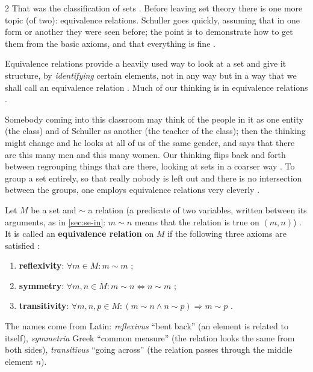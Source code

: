 \begin{paracol}{2}
That was the classification of sets . Before leaving set theory there is one more topic (of two):
equivalence relations. Schuller goes quickly, assuming that in one form or another they were seen before; the point is to
demonstrate how to get them from the basic axioms, and that everything is fine .

Equivalence relations provide a heavily used way to look at a set and give it structure, by \emph{identifying} certain
elements, not in any way but in a way that we shall call an equivalence relation . Much of our
thinking is in equivalence relations .

\begin{intuition}[Regrouping]\label{int:cl-regroup}
Somebody coming into this classroom may think of the people in it as one entity (the class) and of Schuller as
another (the teacher of the class); then the thinking might change and he looks at all of us of the same gender, and says
that there are this many men and this many women. Our thinking flips back and forth between regrouping things that are
there, looking at sets in a coarser way . To group a set entirely, so that really nobody is
left out and there is no intersection between the groups, one employs equivalence relations very cleverly
.
\end{intuition}

\begin{definition}\label{def:cl-equiv}
Let $M$ be a set and $\sim$ a relation (a predicate of two variables, written between its arguments, as in
\cref{sec:se-in}: $m\sim n$ means that the relation is true on $(m,n)$) . It
is called an \textbf{equivalence relation} on $M$ if the following three axioms are satisfied :
\begin{enumerate}
  \item[(i)] \textbf{reflexivity}: $\forall m\in M\colon m\sim m$ ;
  \item[(ii)] \textbf{symmetry}: $\forall m,n\in M\colon m\sim n\Leftrightarrow n\sim m$ ;
  \item[(iii)] \textbf{transitivity}: $\forall m,n,p\in M\colon (m\sim n\wedge n\sim p)\Rightarrow m\sim p$
        .
\end{enumerate}
\end{definition}
The names come from Latin: \emph{reflexivus} ``bent back'' (an element is related to itself), \emph{symmetria} Greek
``common measure'' (the relation looks the same from both sides), \emph{transitivus} ``going across'' (the relation
passes through the middle element $n$).


\end{paracol}
